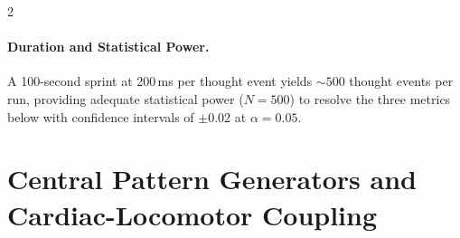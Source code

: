 \begin{multicols}{2}
\paragraph{Duration and Statistical Power.}
A 100-second sprint at 200\,ms per thought event yields $\sim\!500$ thought events per run, providing adequate statistical power ($N = 500$) to resolve the three metrics below with confidence intervals of $\pm 0.02$ at $\alpha = 0.05$.

\end{multicols}

\section{Central Pattern Generators and Cardiac-Locomotor Coupling}

